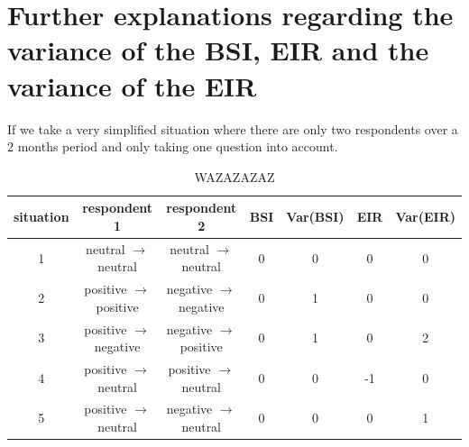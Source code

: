 \documentclass[12pt,a4paper,oneside]{book}
\begin{document}
\newpage
\section*{Further explanations regarding the variance of the BSI, EIR and the variance of the EIR}
\label{chap:appendix:explain Var BSI and EIR}


If we take a very simplified situation where there are only two respondents over a 2 months period and only taking one question into account. 

\begin{table}[H]
    \caption{WAZAZAZAZ}
    \label{tab:explanation of Var and BSI}
    \centering
\begin{tabular}{c|c c c c c c} \footnotesize
situation    & respondent 1 & respondent 2           &  BSI & Var(BSI) & EIR & Var(EIR) \\ \hline
 1 & neutral $\rightarrow$ neutral & neutral $\rightarrow$ neutral & 0 & 0 & 0 & 0   \\
 2 & positive $\rightarrow$ positive & negative $\rightarrow$ negative & 0 & 1 & 0 & 0 \\
 3 & positive $\rightarrow$ negative & negative $\rightarrow$ positive & 0 & 1 & 0 & 2 \\
 4 & positive $\rightarrow$ neutral & positive $\rightarrow$ neutral & 0 & 0 & -1 & 0  \\
 5 & positive $\rightarrow$ neutral & negative $\rightarrow$ neutral & 0 & 0 & 0 & 1  \\
\end{tabular}
\end{table}
%
\end{document}

